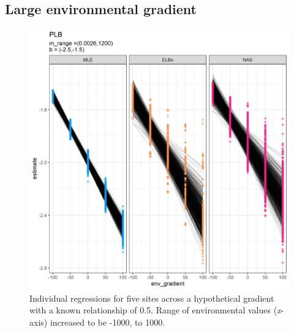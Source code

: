 \documentclass[
]{article}
\begin{document}
\newpage

\hypertarget{large-environmental-gradient}{%
\subsection{Large environmental
gradient}\label{large-environmental-gradient}}

\begin{figure}
\centering
\includegraphics{figures/PLB_large_x_main.png}
\caption{Individual regressions for five sites across a hypothetical
gradient with a known relationship of 0.5. Range of environmental values
(\emph{x}-axis) increased to be -1000, to 1000.}
\end{figure}

\newpage
\end{document}
